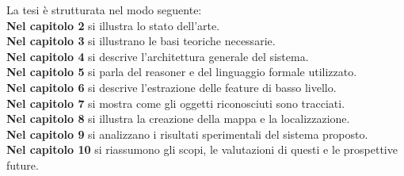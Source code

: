 \noindent
La tesi è strutturata nel modo seguente: \\
\textbf{Nel capitolo 2} si illustra lo stato dell'arte. \\ 
\textbf{Nel capitolo 3} si illustrano le basi teoriche necessarie. \\
\textbf{Nel capitolo 4} si descrive l'architettura generale del sistema. \\
\textbf{Nel capitolo 5} si parla del reasoner e del linguaggio formale utilizzato. \\
\textbf{Nel capitolo 6} si descrive l'estrazione delle feature di basso livello. \\
\textbf{Nel capitolo 7} si mostra come gli oggetti riconosciuti sono tracciati. \\
\textbf{Nel capitolo 8} si illustra la creazione della mappa e la localizzazione. \\
\textbf{Nel capitolo 9} si analizzano i risultati sperimentali del sistema proposto. \\
\textbf{Nel capitolo 10} si riassumono gli scopi, le valutazioni di questi e le prospettive future. 

